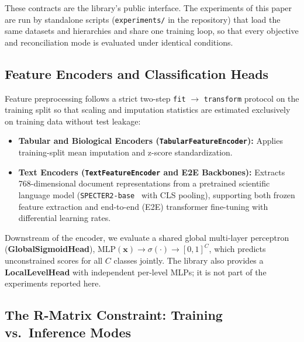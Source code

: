 \documentclass[preprint,12pt]{elsarticle}
\begin{document}
These contracts are the library's public interface. The experiments of this
paper are run by standalone scripts (\texttt{experiments/} in the repository)
that load the same datasets and hierarchies and share one training loop, so
that every objective and reconciliation mode is evaluated under identical
conditions.

\subsection{Feature Encoders and Classification Heads}

Feature preprocessing follows a strict two-step \texttt{fit} $\rightarrow$
\texttt{transform} protocol on the training split so that scaling and
imputation statistics are estimated exclusively on training data without test
leakage:
\begin{itemize}[leftmargin=*,nosep]
  \item \textbf{Tabular and Biological Encoders
    (\texttt{TabularFeatureEncoder}):} Applies training-split mean imputation
    and z-score standardization.
  \item \textbf{Text Encoders (\texttt{TextFeatureEncoder} and E2E Backbones):}
    Extracts 768-dimensional document representations from a pretrained
    scientific language model (\texttt{SPECTER2-base}~\cite{specter2} with CLS
    pooling), supporting both frozen feature extraction and end-to-end (E2E)
    transformer fine-tuning with differential learning rates.
\end{itemize}

Downstream of the encoder, we evaluate a shared global multi-layer perceptron
(\textbf{GlobalSigmoidHead}), $\text{MLP}(\mathbf{x}) \rightarrow \sigma(\cdot)
\rightarrow [0,1]^C$, which predicts unconstrained scores for all $C$ classes
jointly. The library also provides a \textbf{LocalLevelHead} with independent
per-level MLPs; it is not part of the experiments reported here.

\subsection{The R-Matrix Constraint: Training vs.\ Inference Modes}
\label{sec:rmatrix}
\end{document}
